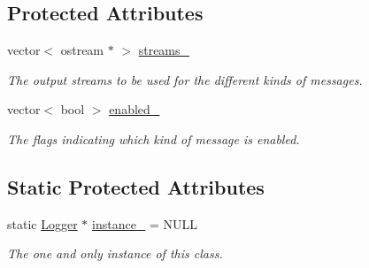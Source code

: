 \subsection*{Protected Attributes}
\begin{DoxyCompactItemize}
\item 
vector$<$ ostream $\ast$ $>$ \hyperlink{classLogger_a6e3fde7c57b8e2ba82876ad2972c375b}{streams\-\_\-}
\begin{DoxyCompactList}\small\item\em The output streams to be used for the different kinds of messages. \end{DoxyCompactList}\item 
vector$<$ bool $>$ \hyperlink{classLogger_a615ed59ba1b2d79509bfeddcc8406398}{enabled\-\_\-}
\begin{DoxyCompactList}\small\item\em The flags indicating which kind of message is enabled. \end{DoxyCompactList}\end{DoxyCompactItemize}
\subsection*{Static Protected Attributes}
\begin{DoxyCompactItemize}
\item 
static \hyperlink{classLogger}{Logger} $\ast$ \hyperlink{classLogger_a4f56ea837ef338071364583d6368b7c8}{instance\-\_\-} = N\-U\-L\-L
\begin{DoxyCompactList}\small\item\em The one and only instance of this class. \end{DoxyCompactList}\end{DoxyCompactItemize}
